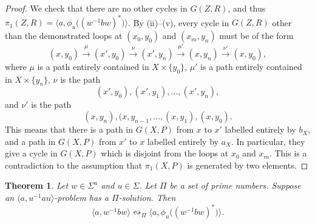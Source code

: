 \documentclass[10pt,a4paper]{amsart}
\newtheorem{theorem}{Theorem}[section]
\theoremstyle{definition}
\theoremstyle{definition}
\numberwithin{equation}{section}
\begin{document}
\begin{proof}
We check that there are no other cycles in $G(Z, R)$, and thus $\pi_1(Z, R)=\big\langle a, \phi_u\big((w^{-1}bw)^*\big)\big\rangle$. By (ii)--(v), every cycle in $G(Z, R)$ other than the demonstrated loops at $(x_0, y_0)$ and $(x_m, y_n)$ must be of the form 
$$ (x, y_0)\stackrel{\mu}{\longrightarrow}(x',y_0)\stackrel{\nu}{\longrightarrow}(x', y_n)\stackrel{\mu'}{\longrightarrow}(x, y_n)\stackrel{\nu'}{\longrightarrow}(x, y_0), $$
where $\mu$ is a path entirely contained in $X\times\{y_0\}$, $\mu'$ is a path entirely contained in $X\times \{y_n\}$, $\nu$ is the path 
$$ (x', y_0), (x', y_1), \dots, (x', y_n), $$
and $\nu'$ is the path
$$ (x, y_n), (x, y_{n-1}, \dots, (x, y_1), (x, y_0). $$
This means that there is a path in $G(X,P)$ from $x$ to $x'$ labelled entirely by $b_X$, and a path in $G(X,P)$ from $x'$ to $x$ labelled entirely by $a_X$. In particular, they give a cycle in $G(X,P)$ which is disjoint from the loops at $x_0$ and $x_m$. This is a contradiction to the assumption that $\pi_1(X, P)$ is generated by two elements.
\end{proof}



\begin{theorem}\label{thm:stationary} Let $w\in \Sigma^a$ and $u\in \Sigma$. Let $\Pi$ be a set of prime numbers. Suppose an $\langle a, u^{-1}au\rangle$-problem has a $\Pi$-solution. Then
$$\langle a, w^{-1}bw\rangle \leftrightsquigarrow_{\Pi} \big\langle a, \phi_u\big((w^{-1}bw)^*\big)\big\rangle.$$
\end{theorem}
\end{document}
